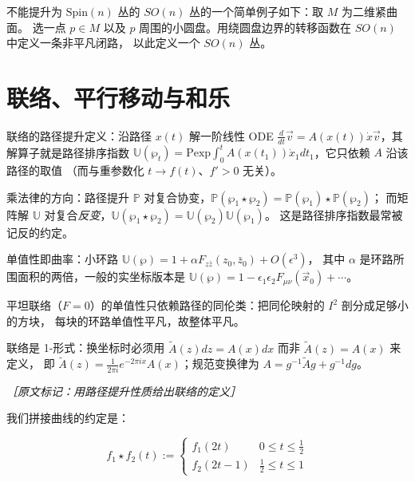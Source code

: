 不能提升为 $\mathrm{Spin}(n)$ 丛的 $SO(n)$ 丛的一个简单例子如下：取 $M$ 为二维紧曲面。
选一点 $p\in M$ 以及 $p$ 周围的小圆盘。用绕圆盘边界的转移函数在 $SO(n)$ 中定义一条非平凡闭路，
以此定义一个 $SO(n)$ 丛。

\section{联络、平行移动与和乐} %

\begin{keytakeaways}
  \item 联络的路径提升定义：沿路径 $x(t)$ 解一阶线性 ODE
    $\frac{d}{dt}\vec{v}=A(x(t))\dot{x}\vec{v}$，其解算子就是路径排序指数
    $\mathbb{U}(\wp_t)=\mathrm{Pexp}\int_0^t A(x(t_1))\dot{x}_1dt_1$，它只依赖 $A$ 沿该路径的取值
    （而与重参数化 $t\to f(t)$、$f'>0$ 无关）。
  \item 乘法律的方向：路径提升 $\mathbb{P}$ 对复合协变，$\mathbb{P}(\wp_1\star\wp_2)=\mathbb{P}(\wp_1)\star\mathbb{P}(\wp_2)$；
    而矩阵解 $\mathbb{U}$ 对复合\emph{反变}，$\mathbb{U}(\wp_1\star\wp_2)=\mathbb{U}(\wp_2)\mathbb{U}(\wp_1)$。
    这是路径排序指数最常被记反的约定。
  \item 单值性即曲率：小环路 $\mathbb{U}(\wp)=1+\alpha F_{z\bar z}(z_0,\bar z_0)+O(\epsilon^3)$，
    其中 $\alpha$ 是环路所围面积的两倍，一般的实坐标版本是
    $\mathbb{U}(\wp)=1-\epsilon_1\epsilon_2F_{\mu\nu}(\vec{x}_0)+\cdots$。
  \item 平坦联络（$F=0$）的单值性只依赖路径的同伦类：把同伦映射的 $I^2$ 剖分成足够小的方块，
    每块的环路单值性平凡，故整体平凡。
  \item 联络是 1-形式：换坐标时必须用 $\tilde{A}(z)dz=A(x)dx$ 而非 $\tilde{A}(z)=A(x)$ 来定义，
    即 $\tilde{A}(z)=\frac{1}{2\pi i}e^{-2\pi ix}A(x)$；规范变换律为
    $A=g^{-1}\widetilde{A}g+g^{-1}dg$。
\end{keytakeaways}

{\small\itshape ［原文标记：用路径提升性质给出联络的定义］}


我们拼接曲线的约定是：

\begin{equation}
  f_1 \star f_2(t) :=
  \begin{cases}
    f_1(2t) & 0\le t\le \tfrac12 \\[2pt]
    f_2(2t-1) & \tfrac12\le t\le 1
  \end{cases}
  \tag{H.1}
  \label{eq:H.1}
\end{equation}

